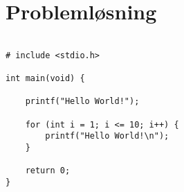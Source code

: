\chapter{Problemløsning}\label{ch:ch3label}


\begin{verbatim}

# include <stdio.h>

int main(void) {
    
    printf("Hello World!");
    
    for (int i = 1; i <= 10; i++) {
        printf("Hello World!\n");
    }
    
    return 0;
}
\end{verbatim}